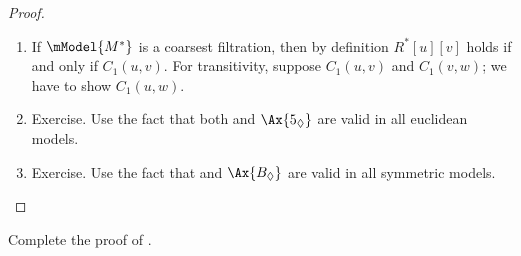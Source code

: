 \documentclass[../../../include/open-logic-section]{subfiles}
\begin{document}
\begin{proof}
\begin{enumerate}
  \item If $\mModel{M^*}$ is a coarsest filtration, then by definition
    $R^*[u][v]$ holds if and only if $C_1(u,v)$. For transitivity,
    suppose $C_1(u,v)$ and $C_1(v,w)$; we have to show
    $C_1(u,w)$. 
  \item Exercise. Use the fact that both  and $\Ax{5_\Diamond}$
    are valid in all euclidean models.
  \item Exercise. Use the fact that  and $\Ax{B_\Diamond}$ are
    valid in all symmetric models.
\end{enumerate}
\end{proof}

\begin{prob}
  Complete the proof of .
\end{prob}
\end{document}

